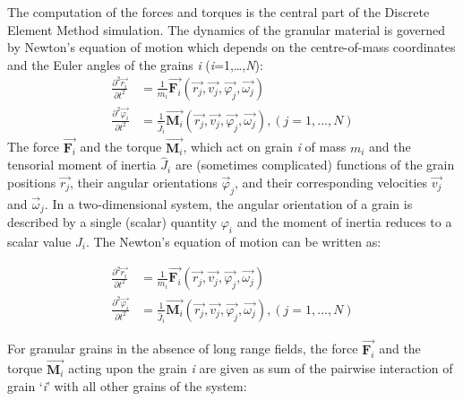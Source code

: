 The computation of the forces and torques is the central part of the Discrete 
Element Method 
simulation. 
The dynamics of the granular material is governed by Newton's equation of 
motion which depends on 
the centre-of-mass coordinates and the Euler angles of the grains 
\textit{i} 
(\textit{i}=1,\dots,\textit{N}):
\begin{align} 
\frac{{{\partial}^2}{\overrightarrow{r_i}}}{\partial{t^2}} 
&=\frac{1}{m_i}\overrightarrow{{\mathbf{F}}_{i}}(\overrightarrow{r_j},\overrightarrow{v_j},
 \overrightarrow{\varphi_j},\overrightarrow{\omega_j})
 \nonumber \\ 
\frac{{\partial^2}{\overrightarrow{\varphi_i}}}{\partial{t^2}}&=\frac{1}{{\hat{J}}_i}\overrightarrow{\mathbf{M}_i}(\overrightarrow{r_j},\overrightarrow{v_j},\overrightarrow{\varphi_j},
   \overrightarrow{\omega_j}), (j=1,...,N) \nonumber
\end{align}
The force $\overrightarrow{\mathbf{F}_{i}}$ and the torque 
$\overrightarrow{\mathbf{M}_{i}}$, 
which 
act on grain \textit{i} of mass $\mathit{m}_{\mathit{i}}$ and the tensorial 
moment of inertia 
${\hat{J}_i}$ are (sometimes complicated) functions of the grain 
positions 
$\overrightarrow{\mathit{r}_{\mathit{j}}}$, their angular orientations 
$\overrightarrow{\varphi}_{\mathit{j}}$, and their corresponding velocities 
$\overrightarrow{\mathit{v}_{\mathit{j}}}$ and 
$\overrightarrow{\omega}_{\mathit{j}}$. In a two-dimensional system, the 
angular 
orientation of a grain is described by a single (scalar) quantity 
$\varphi_{i}$ and the moment 
of inertia reduces to a scalar value $\mathit{J}_{i}$. The Newton's equation 
of motion can be written as:

\begin{align} 
	\frac{{{\partial}^2}{\overrightarrow{r_i}}}{\partial{t^2}} 
	&=\frac{1}{m_i}\overrightarrow{{\mathbf{F}}_{i}}(\overrightarrow{r_j},\overrightarrow{v_j},
	\overrightarrow{\varphi_j},\overrightarrow{\omega_j})
	\nonumber \\ 
	\frac{{\partial^2}{\overrightarrow{\varphi_i}}}{\partial{t^2}}&=\frac{1}{{\hat{J}}_i}\overrightarrow{\mathbf{M}_i}(\overrightarrow{r_j},\overrightarrow{v_j},\overrightarrow{\varphi_j},
	\overrightarrow{\omega_j}), (j=1,...,N) \nonumber
\end{align}

 For granular grains in the absence of long range fields, the force 
 $\overrightarrow{\mathbf{F}_{i}}$ and the torque 
 $\overrightarrow{\mathbf{M}_{i}}$ acting upon 
the 
 grain \textit{i} are given as sum of the pairwise interaction of grain 
 `\textit{i}' with 
all 
 other grains of the system:

